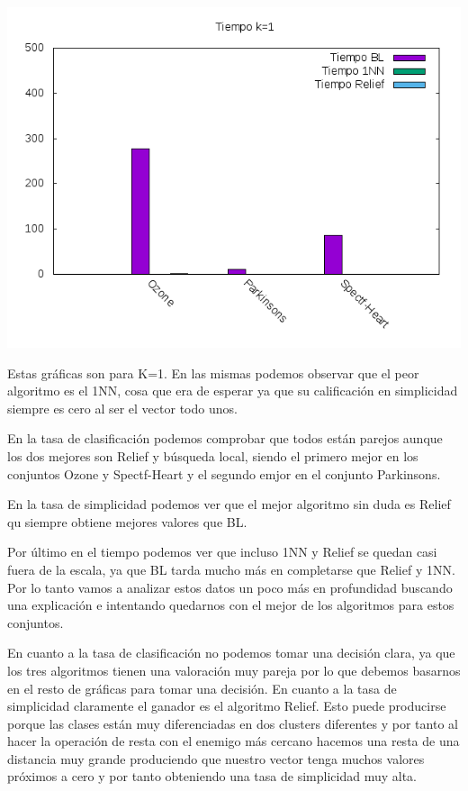 \documentclass[12pt,a4paper]{article}
\begin{document}
	\newline
	\includegraphics*[scale=1]{./Imagenes/K1/tiempo.png}
	
	Estas gráficas son para K=1. En las mismas podemos observar que el peor algoritmo es el 1NN, cosa que era de esperar ya que su calificación en simplicidad siempre es cero al ser el vector todo unos.
	
	En la tasa de clasificación podemos comprobar que todos están parejos aunque los dos mejores son Relief y búsqueda local, siendo el primero mejor en los conjuntos Ozone y Spectf-Heart y el segundo emjor en el conjunto Parkinsons. 
	
	En la tasa de simplicidad podemos ver que el mejor algoritmo sin duda es Relief qu siempre obtiene mejores valores que BL.
	
	Por último en el tiempo podemos ver que incluso 1NN y Relief se quedan casi fuera de la escala, ya que BL tarda mucho más en completarse que Relief y 1NN. Por lo tanto vamos a analizar estos datos un poco más en profundidad buscando una explicación e intentando quedarnos con el mejor de los algoritmos para estos conjuntos.
	
	En cuanto a la tasa de clasificación no podemos tomar una decisión clara, ya que los tres algoritmos tienen una valoración muy pareja por lo que debemos basarnos en el resto de gráficas para tomar una decisión. En cuanto a la tasa de simplicidad claramente el ganador es el algoritmo Relief. Esto puede producirse porque las clases están muy diferenciadas en dos clusters diferentes y por tanto al hacer la operación de resta con el enemigo más cercano hacemos una resta de una distancia muy grande produciendo que nuestro vector tenga muchos valores próximos a cero y por tanto obteniendo una tasa de simplicidad muy alta.
	
\end{document}
